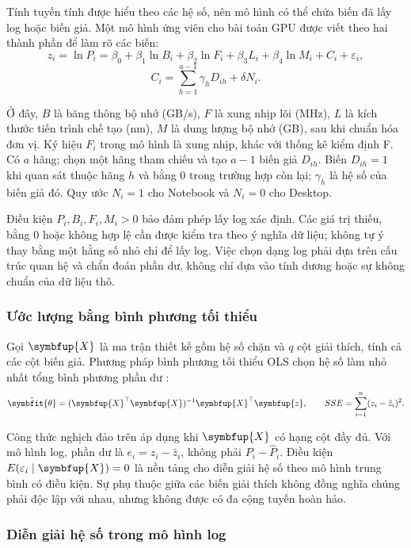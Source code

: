 Tính tuyến tính được hiểu theo các hệ số, nên mô hình có thể chứa biến đã lấy log hoặc biến giả. Một mô hình ứng viên cho bài toán GPU được viết theo hai thành phần để làm rõ các biến:
\nopagebreak[4]
\[z_i=\ln P_i=\beta_0+\beta_1\ln B_i+\beta_2\ln F_i+\beta_3L_i+\beta_4\ln M_i+C_i+\varepsilon_i,\]
\nopagebreak[4]
\[C_i=\sum_{h=1}^{a-1}\gamma_hD_{ih}+\delta N_i.\]

Ở đây, \(B\) là băng thông bộ nhớ (GB/s), \(F\) là xung nhịp lõi (MHz), \(L\) là kích thước tiến trình chế tạo (nm), \(M\) là dung lượng bộ nhớ (GB), sau khi chuẩn hóa đơn vị. Ký hiệu \(F_i\) trong mô hình là xung nhịp, khác với thống kê kiểm định F. Có \(a\) hãng; chọn một hãng tham chiếu và tạo \(a-1\) biến giả \(D_{ih}\). Biến \(D_{ih}=1\) khi quan sát thuộc hãng \(h\) và bằng 0 trong trường hợp còn lại; \(\gamma_h\) là hệ số của biến giả đó. Quy ước \(N_i=1\) cho Notebook và \(N_i=0\) cho Desktop.

Điều kiện \(P_i,B_i,F_i,M_i>0\) bảo đảm phép lấy log xác định. Các giá trị thiếu, bằng 0 hoặc không hợp lệ cần được kiểm tra theo ý nghĩa dữ liệu; không tự ý thay bằng một hằng số nhỏ chỉ để lấy log. Việc chọn dạng log phải dựa trên cấu trúc quan hệ và chẩn đoán phần dư, không chỉ dựa vào tính dương hoặc sự không chuẩn của dữ liệu thô.

\subsubsection{Ước lượng bằng bình phương tối thiểu}

Gọi \(\symbfup{X}\) là ma trận thiết kế gồm hệ số chặn và \(q\) cột giải thích, tính cả các cột biến giả. Phương pháp bình phương tối thiểu OLS chọn hệ số làm nhỏ nhất tổng bình phương phần dư \cite{ref13}:
\nopagebreak[4]
\[\hat{\symbfit{\theta}}=(\symbfup{X}^\top\symbfup{X})^{-1}\symbfup{X}^\top\symbfup{z},\qquad
SSE=\sum_{i=1}^{n}(z_i-\hat z_i)^2.\]

Công thức nghịch đảo trên áp dụng khi \(\symbfup{X}\) có hạng cột đầy đủ. Với mô hình log, phần dư là \(e_i=z_i-\hat z_i\), không phải \(P_i-\hat P_i\). Điều kiện \(E(\varepsilon_i\mid\symbfup{X})=0\) là nền tảng cho diễn giải hệ số theo mô hình trung bình có điều kiện. Sự phụ thuộc giữa các biến giải thích không đồng nghĩa chúng phải độc lập với nhau, nhưng không được có đa cộng tuyến hoàn hảo.

\subsubsection{Diễn giải hệ số trong mô hình log}

